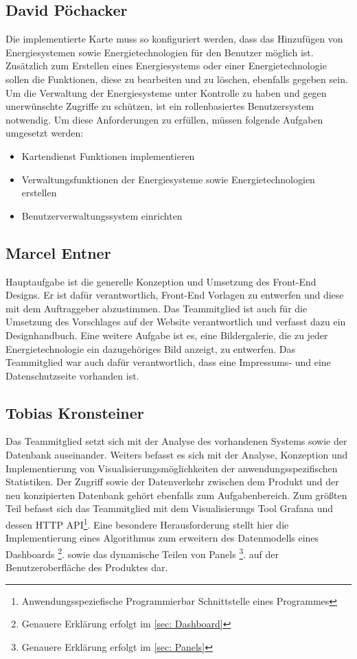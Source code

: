 \subsection{David Pöchacker}
Die implementierte Karte muss so konfiguriert werden, dass das Hinzufügen von Energiesystemen sowie Energietechnologien für den Benutzer möglich ist. Zusätzlich zum Erstellen eines Energiesystems oder einer Energietechnologie sollen die Funktionen, diese zu bearbeiten und zu löschen, ebenfalls gegeben sein. Um die Verwaltung der Energiesysteme unter Kontrolle zu haben und gegen unerwünschte Zugriffe zu schützen, ist ein rollenbasiertes Benutzersystem notwendig. Um diese Anforderungen zu erfüllen, müssen folgende Aufgaben umgesetzt werden:
\begin{itemize}
	\item Kartendienst Funktionen implementieren
	\item Verwaltungsfunktionen der Energiesysteme sowie Energietechnologien erstellen
	\item Benutzerverwaltungssystem einrichten
\end{itemize}



\subsection{Marcel Entner}
Hauptaufgabe ist die generelle Konzeption und Umsetzung des Front-End Designs. Er ist dafür verantwortlich, Front-End Vorlagen zu entwerfen und diese mit dem Auftraggeber abzustimmen. Das Teammitglied ist auch für die Umsetzung des Vorschlages auf der Website verantwortlich und verfasst dazu ein Designhandbuch. Eine weitere Aufgabe ist es, eine Bildergalerie, die zu jeder Energietechnologie ein dazugehöriges Bild anzeigt, zu entwerfen. Das Teammitglied  war auch dafür verantwortlich, dass eine Impressums- und eine Datenschutzseite vorhanden ist. 

\subsection{Tobias Kronsteiner}
Das Teammitglied setzt sich mit der Analyse des vorhandenen Systems sowie der Datenbank auseinander. Weiters befasst es sich mit der Analyse, Konzeption und Implementierung von Visualisierungsmöglichkeiten der anwendungsspezifischen Statistiken. Der Zugriff sowie der Datenverkehr zwischen dem Produkt und der neu konzipierten Datenbank gehört ebenfalls zum Aufgabenbereich. Zum größten Teil befasst sich das Teammitglied mit dem Visualisierungs Tool Grafana und dessen HTTP API\footnote{Anwendungsspeziefische Programmierbar Schnittstelle eines Programmes }. 
Eine besondere Herausforderung stellt hier die Implementierung eines Algorithmus zum erweitern des Datenmodells eines Dashboards \footnote{ Genauere Erklärung erfolgt im \autoref{sec: Dashboard}}. sowie das dynamische Teilen von Panels \footnote{ Genauere Erklärung erfolgt im \autoref{sec: Panels}}. auf der Benutzeroberfläche des Produktes dar. 





